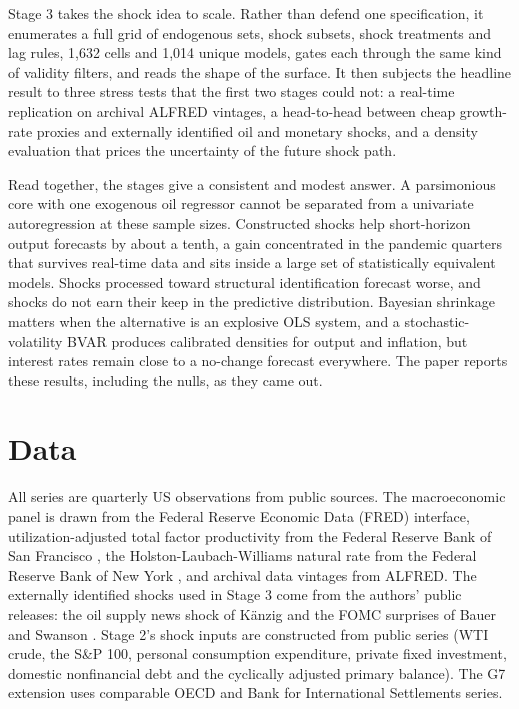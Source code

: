 \documentclass[conference]{IEEEtran}
\begin{document}
Stage 3 takes the shock idea to scale. Rather than defend one specification, it enumerates a full grid of endogenous sets, shock subsets, shock treatments and lag rules, 1,632 cells and 1,014 unique models, gates each through the same kind of validity filters, and reads the shape of the surface. It then subjects the headline result to three stress tests that the first two stages could not: a real-time replication on archival ALFRED vintages, a head-to-head between cheap growth-rate proxies and externally identified oil \cite{kanzig2021} and monetary \cite{bauerswanson2023} shocks, and a density evaluation that prices the uncertainty of the future shock path.

Read together, the stages give a consistent and modest answer. A parsimonious core with one exogenous oil regressor cannot be separated from a univariate autoregression at these sample sizes. Constructed shocks help short-horizon output forecasts by about a tenth, a gain concentrated in the pandemic quarters that survives real-time data and sits inside a large set of statistically equivalent models. Shocks processed toward structural identification forecast worse, and shocks do not earn their keep in the predictive distribution. Bayesian shrinkage matters when the alternative is an explosive OLS system, and a stochastic-volatility BVAR produces calibrated densities for output and inflation, but interest rates remain close to a no-change forecast everywhere. The paper reports these results, including the nulls, as they came out.

\section{Data}
All series are quarterly US observations from public sources. The macroeconomic panel is drawn from the Federal Reserve Economic Data (FRED) interface, utilization-adjusted total factor productivity from the Federal Reserve Bank of San Francisco \cite{fernald2014}, the Holston-Laubach-Williams natural rate from the Federal Reserve Bank of New York \cite{hlw2023}, and archival data vintages from ALFRED. The externally identified shocks used in Stage 3 come from the authors' public releases: the oil supply news shock of K\"anzig \cite{kanzig2021} and the FOMC surprises of Bauer and Swanson \cite{bauerswanson2023}. Stage 2's shock inputs are constructed from public series (WTI crude, the S\&P 100, personal consumption expenditure, private fixed investment, domestic nonfinancial debt and the cyclically adjusted primary balance). The G7 extension uses comparable OECD and Bank for International Settlements series.
\end{document}
